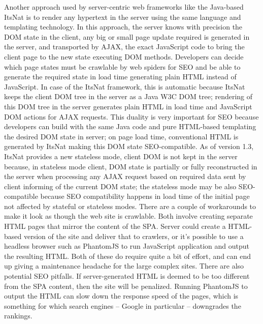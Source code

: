 Another approach used by server-centric web frameworks like the Java-based ItsNat is to render any hypertext in the server using the same language and templating technology. In this approach, the server knows with precision the DOM state in the client, any big or small page update required is generated in the server, and transported by AJAX, the exact JavaScript code to bring the client page to the new state executing DOM methods. Developers can decide which page states must be crawlable by web spiders for SEO and be able to generate the required state in load time generating plain HTML instead of JavaScript. In case of the ItsNat framework, this is automatic because ItsNat keeps the client DOM tree in the server as a Java W3C DOM tree; rendering of this DOM tree in the server generates plain HTML in load time and JavaScript DOM actions for AJAX requests. This duality is very important for SEO because developers can build with the same Java code and pure HTML-based templating the desired DOM state in server; on page load time, conventional HTML is generated by ItsNat making this DOM state SEO-compatible. As of version 1.3, ItsNat provides a new stateless mode, client DOM is not kept in the server because, in stateless mode client, DOM state is partially or fully reconstructed in the server when processing any AJAX request based on required data sent by client informing of the current DOM state; the stateless mode may be also SEO-compatible because SEO compatibility happens in load time of the initial page not affected by stateful or stateless modes.
There are a couple of workarounds to make it look as though the web site is crawlable. Both involve creating separate HTML pages that mirror the content of the SPA. Server could create a HTML-based version of the site and deliver that to crawlers, or it's possible to use a headless browser such as PhantomJS to run JavaScript application and output the resulting HTML.
Both of these do require quite a bit of effort, and can end up giving a maintenance headache for the large complex sites. There are also potential SEO pitfalls. If server-generated HTML is deemed to be too different from the SPA content, then the site will be penalized. Running PhantomJS to output the HTML can slow down the response speed of the pages, which is something for which search engines – Google in particular – downgrades the rankings.


